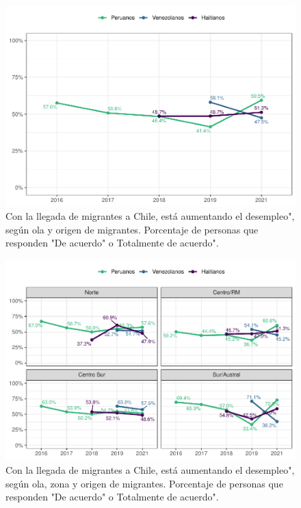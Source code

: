 \documentclass[
  12pt,
]{book}
\begin{document}
\begin{figure}

{\centering \includegraphics{reporte-elsoc_files/figure-latex/amen1-wave-1} 

}

\caption{Con la llegada de migrantes a Chile, está aumentando el desempleo", según ola y origen de migrantes. Porcentaje de personas que responden "De acuerdo" o Totalmente de acuerdo".}\label{fig:amen1-wave}
\end{figure}

\begin{figure}

{\centering \includegraphics{reporte-elsoc_files/figure-latex/amen1-zona-1} 

}

\caption{Con la llegada de migrantes a Chile, está aumentando el desempleo", según ola, zona y origen de migrantes. Porcentaje de personas que responden "De acuerdo" o Totalmente de acuerdo".}\label{fig:amen1-zona}
\end{figure}
\end{document}
